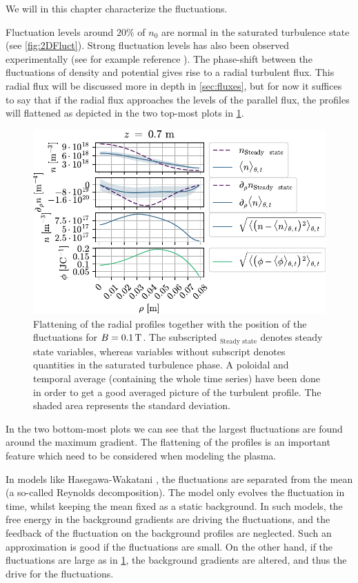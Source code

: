 We will in this chapter characterize the fluctuations.

Fluctuation levels around $20\%$ of $n_0$ are normal in the saturated turbulence state (see \cref{fig:2DFluct}).
Strong fluctuation levels has also been observed experimentally (see for example reference \cite{Burin2005}).
The phase-shift between the fluctuations of density and potential gives rise to a radial turbulent flux.
This radial flux will be discussed more in depth in \cref{sec:fluxes}, but for now it suffices to say that if the radial flux approaches the levels of the parallel flux, the profiles will flattened as depicted in the two top-most plots in \cref{fig:posOfFluct01}.
%
\begin{figure}[h!]
    \begin{center}
        \includegraphics{fig/results/posOfFluct/posOfFluctB01}
    \end{center}
    \caption{Flattening of the radial profiles together with the position of the fluctuations for $B=0.1\, \text{T}$.
        The subscripted $_\text{Steady state}$ denotes steady state variables, whereas variables without subscript denotes quantities in the saturated turbulence phase.
        A poloidal and temporal average (containing the whole time series) have been done in order to get a good averaged picture of the turbulent profile.
        The shaded area represents the standard deviation.
    }
    \label{fig:posOfFluct01}
\end{figure}
%
In the two bottom-most plots we can see that the largest fluctuations are found around the maximum gradient.
The flattening of the profiles is an important feature which need to be considered when modeling the plasma.

In models like Hasegawa-Wakatani \cite{Hasegawa1987,Holland2007}, the fluctuations are separated from the mean (a so-called Reynolds decomposition).
The model only evolves the fluctuation in time, whilst keeping the mean fixed as a static background.
In such models, the free energy in the background gradients are driving the fluctuations, and the feedback of the fluctuation on the background profiles are neglected.
Such an approximation is good if the fluctuations are small.
On the other hand, if the fluctuations are large as in \cref{fig:posOfFluct01}, the background gradients are altered, and thus the drive for the fluctuations.

